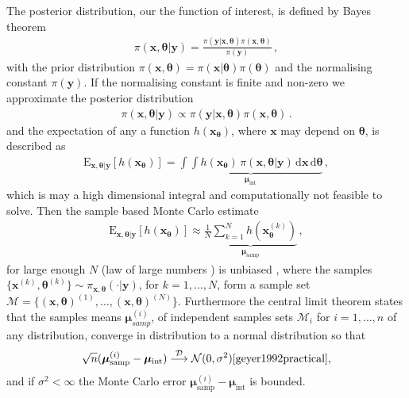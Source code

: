 The posterior distribution, our the function of interest, is defined by Bayes theorem
\begin{align}
	\pi(\bm{x},\bm{\theta}|\bm{y}) = \frac{ \pi(\bm{y} | \bm{x}, \bm{\theta} ) \pi(\bm{x}, \bm{\theta})}{\pi(\bm{y})} \, ,
\end{align}
with the prior distribution $\pi(\bm{x}, \bm{\theta}) = \pi(\bm{x}| \bm{\theta}) \pi(\bm{\theta}) $ and the normalising constant $\pi(\bm{y})$.
If the normalising constant is finite and non-zero we approximate the posterior distribution
\begin{align}
	\pi(\bm{x},\bm{\theta}|\bm{y}) \propto \pi(\bm{y} | \bm{x}, \bm{\theta} ) \pi(\bm{x}, \bm{\theta}) \, .
\end{align}
and the expectation of any a function $h(\bm{x}_{\bm{\theta}})$, where $\bm{x}$ may depend on $\bm{\theta}$, is described as 
\begin{align}
	\text{E}_{\bm{x},\bm{\theta}|\bm{y}} [h(\bm{x}_{\bm{\theta}})] =  \underbrace{\int \int   h(\bm{x}_{\bm{\theta}}) \,  \pi(\bm{x}, \bm{\theta} | \bm{y} ) \, \text{d} \bm{x}  \, \text{d} \bm{\theta}}_{\bm{\mu}_{\text{int}}}   \label{eq:expPos} \, ,
\end{align}
which is may a high dimensional integral and computationally not feasible to solve.
Then the sample based Monte Carlo estimate
\begin{align}
	\label{eq:sampMean}
	\text{E}_{\bm{x},\bm{\theta}|\bm{y}} [h(\bm{x}_{\bm{\theta}})] \approx \underbrace{ \frac{1}{N} \sum_{k=1}^{N} h(\bm{x}^{(k)}_{\bm{\theta}})  }_{\bm{\mu}_{\text{samp}}} \, ,
\end{align}
for large enough $N$ (law of large numbers \cite[Chapter 17]{tweedie2009measprob}) is unbiased \cite{roberts2004general}, where the samples $\{\bm{x}^{(k)},\bm{\theta}^{(k)} \}\sim \pi_{\bm{x}, \bm{\theta}}(\cdot|\bm{y})$, for $k = 1, \dots, N$, form a sample set $\mathcal{M} =\{ (\bm{x},\bm{\theta})^{(1)}, \dots ,  (\bm{x},\bm{\theta})^{(N)} \}$.
Furthermore the central limit theorem states that the samples means $ \bm{\mu}^{(i)}_{samp} $, of independent samples sets $\mathcal{M}_i$ for $i = 1, \dots, n$ of any distribution, converge in distribution to a normal distribution so that
\begin{align}
	\sqrt{n} (\bm{\mu}^{(i)}_{\text{samp}} -  \bm{\mu}_{\text{int}} ) \overset{\mathcal{D}}{\longrightarrow} \mathcal{N} (0,\sigma^2) \text{\cite{geyer1992practical}},
\end{align}
and if $\sigma^2 < \infty$ the Monte Carlo error $\bm{\mu}^{(i)}_{\text{samp}} -  \bm{\mu}_{\text{int}} $ is bounded.

